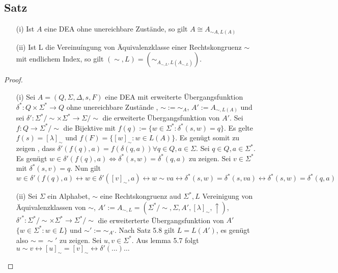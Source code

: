\documentclass[a4paper,11pt]{article}
\begin{document}
\subsection{Satz}
\begin{itemize}
  \item [(i)] Ist $A$ eine DEA ohne unereichbare Zustände, so gilt $A \cong A_{\sim A, L(A)}$
  \item [(ii)] Ist L die Vereinuíngung von Äquivalenzklasse einer Rechtskongruenz $\sim$ mit endlichem Index, so gilt $(\sim, L) = (\sim_{A_{\sim, L}, L(A_{\sim, L})})$.
\end{itemize}

\begin{proof}
  \begin{itemize}
    \item [(i)] Sei $A = (Q, \Sigma, \Delta, s, F)$ eine DEA mit erweiterte Übergangsfunktion $\delta^* : Q \times \Sigma^* \to Q$ ohne unereichbare Zustände , $\sim := \sim_A$, $A' := A_{\sim, L(A)}$ und sei $\delta' : \Sigma^* / \sim \times \Sigma^* \to \Sigma/\sim$ die erweiterte Übergangsfunktion von $A'$. Sei $f : Q \to \Sigma^* / \sim$ die Bijektive mit $f(q) := \{ w \in \Sigma^* : \delta^*(s,w) = q\}$. Es gelte $f(s) = [\lambda]_{\sim}$ und $f(F) = \{[w]_{\sim} : w \in L(A)\}$. Es genügt somit zu zeigen , dass $\delta'(f(q), a) = f(\delta(q,a)) \forall q \in Q, a \in \Sigma$. Sei $q \in Q, a \in \Sigma^*$. Es genügt $w \in \delta' (f(q), a) \Leftrightarrow \delta^*(s,w) = \delta^*(q, a)$ zu zeigen. Sei $v \in \Sigma^*$ mit $\delta^*(s,v) = q$. Nun gilt $w \in \delta'(f(q), a) \leftrightarrow w \in \delta'([v]_{\sim}, a) \leftrightarrow w \sim va \leftrightarrow \delta^*(s,w) = \delta^*(s, va) \leftrightarrow \delta^*(s,w) = \delta^*(q,a)$  %
    \item [(ii)] Sei $\Sigma$ ein Alphabet, $\sim$ eine Rechtskongruenz aud $\Sigma^*, L$ Vereinigung von Äquivalenzklassen von $\sim$, $A' := A_{\sim, L} = (\Sigma^*/\sim, \Sigma, A', [\lambda]_{\sim}, \uparrow)$, $\delta'^* : \Sigma^*/\sim \times \Sigma^* \to \Sigma^*/\sim$ die erweiterterte Übergangsfunktion von $A'$ $\{w \in \Sigma^* : w \in L \}$ und $\sim' := \sim_{A'}$. Nach Satz 5.8 gilt $L = L(A')$, es genügt also $\sim = \sim'$ zu zeigen. Sei $u, v \in \Sigma^*$. Aus lemma 5.7 folgt $u \sim v \leftrightarrow 
    [u]_{\sim} = [v]_{\sim} \leftrightarrow \delta'(...)$$\dots$
  \end{itemize}
\end{proof}
\end{document}
